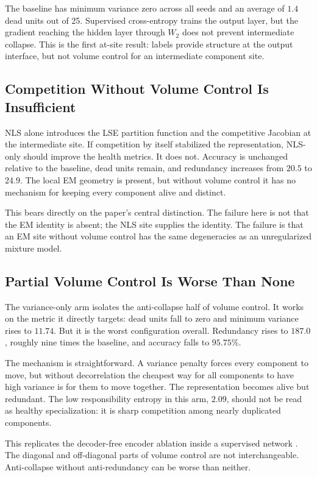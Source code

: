The baseline has minimum variance zero across all seeds and an average of
$1.4$ dead units out of 25. Supervised cross-entropy trains the output layer,
but the gradient reaching the hidden layer through $W_2$ does not prevent
intermediate collapse. This is the first at-site result: labels provide
structure at the output interface, but not volume control for an intermediate
component site.

\subsection{Competition Without Volume Control Is Insufficient}
NLS alone introduces the LSE partition function and the competitive Jacobian
at the intermediate site. If competition by itself stabilized the
representation, NLS-only should improve the health metrics. It does not.
Accuracy is unchanged relative to the baseline, dead units remain, and
redundancy increases from $20.5$ to $24.9$. The local EM geometry is present,
but without volume control it has no mechanism for keeping every component
alive and distinct.

This bears directly on the paper's central distinction. The failure here is
not that the EM identity is absent; the NLS site supplies the identity. The
failure is that an EM site without volume control has the same degeneracies as
an unregularized mixture model.

\subsection{Partial Volume Control Is Worse Than None}
The variance-only arm isolates the anti-collapse half of volume control. It
works on the metric it directly targets: dead units fall to zero and minimum
variance rises to $11.74$. But it is the worst configuration overall.
Redundancy rises to $187.0$, roughly nine times the baseline, and accuracy
falls to $95.75\%$.

The mechanism is straightforward. A variance penalty forces every component to
move, but without decorrelation the cheapest way for all components to have
high variance is for them to move together. The representation becomes alive
but redundant. The low responsibility entropy in this arm, $2.09$, should not
be read as healthy specialization: it is sharp competition among nearly
duplicated components.

This replicates the decoder-free encoder ablation inside a supervised network
\citep{oursland2026decoderfree}. The diagonal and off-diagonal parts of volume
control are not interchangeable. Anti-collapse without anti-redundancy can be
worse than neither.

